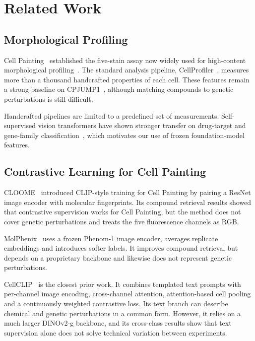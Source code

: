 \section{Related Work}

\subsection{Morphological Profiling}

Cell Painting~\cite{bray2016cellpainting} established the five-stain assay now widely used for
high-content morphological profiling~\cite{seal2024cellpainting}. The standard analysis pipeline,
CellProfiler~\cite{carpenter2006cellprofiler}, measures more than a thousand handcrafted properties
of each cell. These features remain a strong baseline on CPJUMP1~\cite{chandrasekaran2024jump},
although matching compounds to genetic perturbations is still difficult.

Handcrafted pipelines are limited to a predefined set of measurements. Self-supervised vision
transformers have shown stronger transfer on drug-target and gene-family
classification~\cite{moshkov2025ssl}, which motivates our use of frozen foundation-model features.

\subsection{Contrastive Learning for Cell Painting}

CLOOME~\cite{sanchez2023cloome} introduced CLIP-style training for Cell Painting by pairing a
ResNet image encoder with molecular fingerprints. Its compound retrieval results showed that
contrastive supervision works for Cell Painting, but the method does not cover genetic
perturbations and treats the five fluorescence channels as RGB.

MolPhenix~\cite{fradkin2024molphenix} uses a frozen Phenom-1 image encoder, averages replicate
embeddings and introduces softer labels. It improves compound retrieval but depends on a
proprietary backbone and likewise does not represent genetic perturbations.

CellCLIP~\cite{lu2025cellclip} is the closest prior work. It combines templated text prompts with
per-channel image encoding, cross-channel attention, attention-based cell pooling and a
continuously weighted contrastive loss. Its text branch can describe chemical and genetic
perturbations in a common form. However, it relies on a much larger DINOv2-g backbone, and its
cross-class results show that text supervision alone does not solve technical variation between
experiments.

